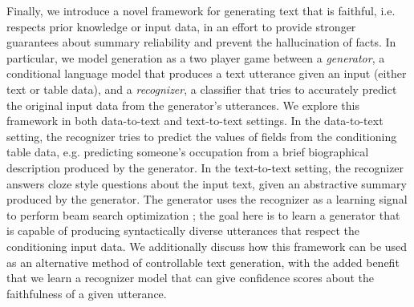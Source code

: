 Finally, we introduce a novel framework for
generating text that is faithful, i.e. respects prior knowledge or input data, 
in an effort to provide stronger guarantees 
about summary reliability and prevent the hallucination of facts. 
In particular, we model generation as a two player
game between a \textit{generator}, 
a conditional language model that produces a 
text utterance given an input (either text or table data), and 
a \textit{recognizer}, a classifier that tries to accurately predict the 
original input data from the generator's utterances. 
We explore this framework in both data-to-text and text-to-text settings.
In the data-to-text setting, the recognizer tries to predict the values of 
fields from the conditioning table data, e.g. 
predicting someone's occupation from a brief
biographical description produced by the generator.
In the text-to-text setting, the recognizer answers cloze style questions
\citep{taylor1953cloze}
about the input text, given an abstractive summary produced by the generator.
The generator uses the recognizer as a learning signal to perform beam 
search optimization \citep{wiseman2016sequence}; the goal here is to learn a generator that is capable of
producing syntactically diverse utterances that respect the conditioning
input data. We additionally discuss how this framework can be used as an 
alternative method of controllable text generation, with the added benefit
that we learn a recognizer model that can give confidence scores about
the faithfulness of a given utterance.



